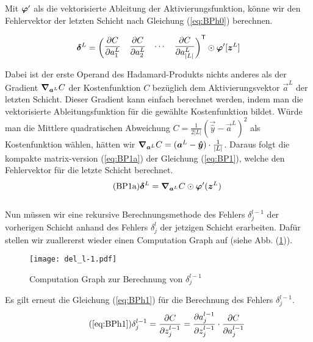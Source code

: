 Mit $\bm{\varphi}'$ als die vektorisierte Ableitung der Aktivierungsfunktion,
könne wir den Fehlervektor der letzten Schicht nach Gleichung (\ref{eq:BPh0}) berechnen.

\begin{equation}\label{eq:BPh0}
  \bm{\delta}^L = \begin{pmatrix} \displaystyle\frac{\partial C}{\partial a_1^L} & \displaystyle\frac{\partial C}{\partial a_2^L} & \cdots & \displaystyle\frac{\partial C}{\partial a_{|L|}^L}\end{pmatrix}^{\mathsf{T}} \odot \bm{\varphi}'[\bm{z}^L]
\end{equation}

Dabei ist der erste Operand des Hadamard-Produkts nichts anderes als
der Gradient $\bm{\nabla}_{\bm{a}^L} C$ der Kostenfunktion $C$ bezüglich dem Aktivierungsvektor
$\vec{a}^L$ der letzten Schicht. Dieser Gradient kann einfach berechnet werden, indem man die
vektorisierte Ableitungsfunktion für die gewählte Kostenfunktion bildet. Würde man die
Mittlere quadratischen Abweichung $C = \frac{1}{2|L|}(\vec{\hat{y}} - \vec{a}^L)^2$ als Kostenfunktion wählen, hätten wir
$\bm{\nabla}_{\bm{a}^L} C = (\bm{a}^L - \bm{\hat{y}}) \cdot \frac{1}{|L|}$.
\para{}
Daraus folgt die kompakte matrix-version (\ref{eq:BP1a}) der Gleichung
(\ref{eq:BP1}), welche den Fehlervektor für die letzte Schicht berechnet.
\\
\begin{equation}\tag{BP1a}\label{eq:BP1a}
  \bm{\delta}^L = \bm{\nabla}_{\bm{a}^L}C \odot \bm{\varphi}'(\bm{z}^L)
\end{equation}
\\
Nun müssen wir eine rekursive Berechnungsmethode des Fehlers $\delta_j^{l-1}$
der vorherigen Schicht anhand des Fehlers $\delta_j^l$ der jetzigen Schicht
erarbeiten. Dafür stellen wir zuallererst wieder einen Computation Graph auf
(siehe Abb. (\ref{fig:cg_L-1})).
\para{}
\begin{figure}[h!]
  \centering
  \texttt{[image: del\_l-1.pdf]}
  \caption{Computation Graph zur Berechnung von $\delta_j^{l-1}$}
  \label{fig:cg_L-1}
\end{figure}
\para{}
Es gilt erneut die Gleichung (\ref{eq:BPh1}) für die Berechnung des Fehlers $\delta_j^{l-1}$.
\\
\begin{equation}\tag{\ref{eq:BPh1}}
  \delta_j^{l-1} = \partderiv{C}{z_j^{l-1}} = \partderiv{a_j^{l-1}}{z_j^{l-1}} \cdot \partderiv{C}{a_j^{l-1}}
\end{equation}
\\
